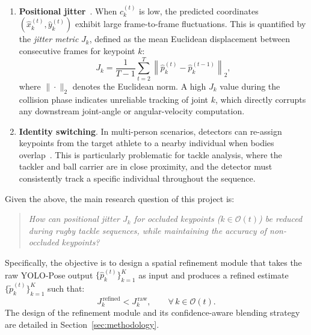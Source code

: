 \documentclass{article}
\begin{document}
\begin{enumerate}

  \item \textbf{Positional jitter}~\cite{zeng2022smoothnet}.
  When $c_k^{(t)}$ is low, the predicted coordinates
  $(\hat{x}_k^{(t)},\hat{y}_k^{(t)})$ exhibit large frame-to-frame
  fluctuations.
  This is quantified by the \emph{jitter metric} $J_k$, defined as the
  mean Euclidean displacement between consecutive frames for keypoint $k$:
  \begin{equation}
    J_k = \frac{1}{T-1}
          \sum_{t=2}^{T}
          \left\|
            \hat{p}_k^{(t)} - \hat{p}_k^{(t-1)}
          \right\|_2,
    \label{eq:jitter}
  \end{equation}
  where $\|\cdot\|_2$ denotes the Euclidean norm.
  A high $J_k$ value during the collision phase indicates unreliable
  tracking of joint $k$, which directly corrupts any downstream
  joint-angle or angular-velocity computation.

  \item \textbf{Identity switching}.
  In multi-person scenarios, detectors can re-assign keypoints from the target athlete to a nearby
  individual when bodies overlap~\cite{zheng2021survey}.
  This is particularly problematic for tackle analysis, where the tackler
  and ball carrier are in close proximity, and the detector must
  consistently track a specific individual throughout the sequence.

\end{enumerate}

Given the above, the main research question of this project is:
\begin{quote}
  \textit{How can positional jitter $J_k$ for occluded keypoints
  ($k \in \mathcal{O}(t)$) be reduced during rugby tackle sequences,
  while maintaining the accuracy of non-occluded keypoints?}
\end{quote}

Specifically, the objective is to design a spatial refinement module that
takes the raw YOLO-Pose output
$\bigl\{\hat{p}_k^{(t)}\bigr\}_{k=1}^{K}$
as input and produces a refined estimate
$\bigl\{\tilde{p}_k^{(t)}\bigr\}_{k=1}^{K}$ such that:
\begin{equation}
  J_k^{\,\text{refined}} < J_k^{\,\text{raw}},
  \qquad \forall\, k \in \mathcal{O}(t).
  \label{eq:objective}
\end{equation}
The design of the refinement module and its confidence-aware blending
strategy are detailed in Section~\ref{sec:methodology}.
\end{document}

